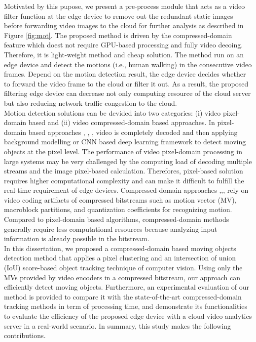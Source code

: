  Motivated by this pupose, we present a pre-process module that acts as a video filter function at the edge device to remove out the redundant static images before forwarding video images to the cloud for further analysis as described in Figure \ref{fig:mot}. The proposed method is driven by the compressed-domain feature which doest not require GPU-based processing and fully video decoing. Therefore, it is light-weight method and cheap solution. The  method run on an edge device and detect the motions (i.e., human walking) in the consecutive video frames. Depend on the motion detection result, the edge device decides whether to forward the video frame to the cloud or filter it out. As a result, the proposed filtering edge device can decrease not only computing resource of the cloud server but also reducing network traffic congestion to the cloud. \\
Motion detection solutions can be devided into two categories: (i) video pixel-domain based and (ii) video compressed-domain based approaches. In pixel-domain based approaches \cite{lu2014moving}, \cite{kumar2016segmentation}, \cite{gujrathi2014detecting}, \cite{wang2019ground} video is completely decoded and then applying background modelling or CNN based deep learning framework to detect moving objects at the pixel level. The performance of video pixel-domain processing in large systems may be very challenged by the computing load of decoding multiple streams and the image pixel-based calculation. Therefores, pixel-based solution requires higher computational complexity and can make it difficult to fulfill the real-time requirement of edge devices. 
Compressed-domain approaches \cite{favalli2000object},\cite{yoneyama1999moving},\cite{dong2006object},\cite{achanta2002compressed} rely on video coding artifacts of compressed bitstreams such as motion vector (MV), macroblock partitions, and quantization coefficients for recognizing motion. Compared to pixel-domain based algorithms, compressed-domain methods generally require less computational resources because analyzing input information is already possible in the bitstream.
\\ In this dissertation, we proposed a compressed-domain based moving objects detection method that applies a pixel clustering and an intersection of union (IoU) score-based object tracking technique of computer vision. Using only the MVs provided by video encoders in a compressed bitstream, our approach can efficiently detect moving objects. Furthermore, an experimental evaluation of our method is provided to compare it with the state-of-the-art compressed-domain tracking methods in term of processing time, and demonstrate its functionalities to evaluate the efficiency of the proposed edge device with a cloud video analytics server in a real-world scenario. In summary, this study makes the following contributions.
